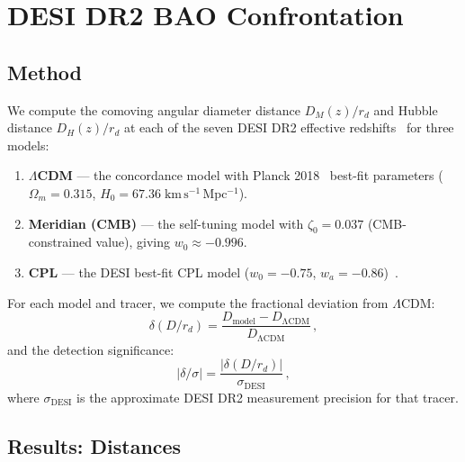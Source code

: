 \section{DESI DR2 BAO Confrontation}
\label{sec:2-DESI}

\subsection{Method}
\label{sec:2-DESI-method}

We compute the comoving angular diameter distance $D_M(z)/r_d$ and Hubble distance $D_H(z)/r_d$ at each of the seven DESI DR2 effective redshifts~\cite{ch2:DESIDR2} for three models:
\begin{enumerate}
    \item \textbf{$\Lambda$CDM} --- the concordance model with Planck 2018~\cite{ch2:Planck2018} best-fit parameters ($\Omega_m = 0.315$, $H_0 = 67.36\;\mathrm{km\,s^{-1}\,Mpc^{-1}}$).
    \item \textbf{Meridian (CMB)} --- the self-tuning model with $\zeta_0 = 0.037$ (CMB-constrained value), giving $w_0 \approx -0.996$.
    \item \textbf{CPL} --- the DESI best-fit CPL model ($w_0 = -0.75$, $w_a = -0.86$)~\cite{ch2:DESIDR2}.
\end{enumerate}

For each model and tracer, we compute the fractional deviation from $\Lambda$CDM:
\begin{equation}
\delta(D/r_d) = \frac{D_\mathrm{model} - D_\mathrm{\Lambda CDM}}{D_\mathrm{\Lambda CDM}}\,,
\label{eq:2-delta}
\end{equation}
and the detection significance:
\begin{equation}
|\delta/\sigma| = \frac{|\delta(D/r_d)|}{\sigma_\mathrm{DESI}}\,,
\label{eq:2-significance}
\end{equation}
where $\sigma_\mathrm{DESI}$ is the approximate DESI DR2 measurement precision for that tracer.

\subsection{Results: Distances}
\label{sec:2-DESI-distances}

